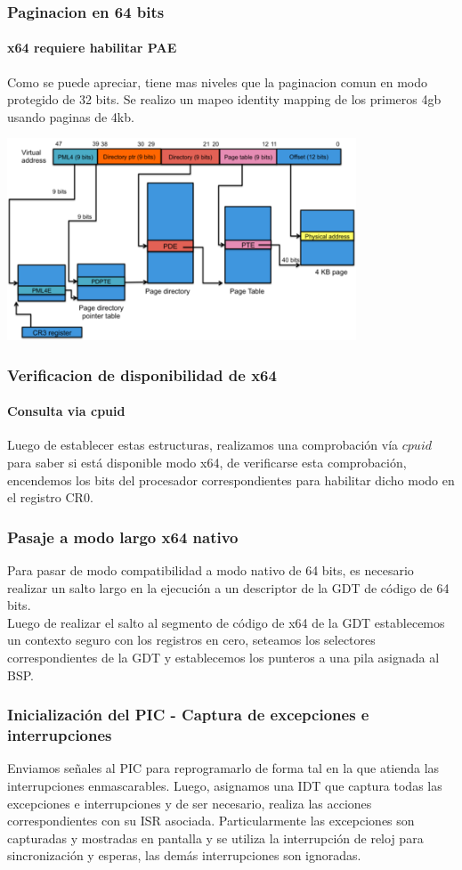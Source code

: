\documentclass{beamer}
\begin{document}
	\begin{frame}
		\frametitle{Paginacion en 64 bits}
		\framesubtitle{x64 requiere habilitar PAE}
		Como se puede apreciar, tiene mas niveles que la paginacion comun en modo protegido de 32 bits.
		Se realizo un mapeo identity mapping de los primeros 4gb usando paginas de 4kb.
		\begin{center}
	        \includegraphics[height=6cm]{images/ia32-paging-overview.png}
	    \end{center}
	\end{frame}

	\begin{frame}
		\frametitle{Verificacion de disponibilidad de x64}
		\framesubtitle{Consulta via cpuid}
		Luego de establecer estas estructuras, realizamos una comprobación vía $cpuid$ para saber si está disponible modo x64, de verificarse esta comprobación, encendemos los bits del procesador correspondientes para habilitar dicho modo en el registro CR0.
	\end{frame}

	\begin{frame}
	    \frametitle{Pasaje a modo largo x64 nativo}

	    Para pasar de modo compatibilidad a modo nativo de 64 bits, es necesario realizar un salto largo en la ejecución a un descriptor de la GDT de código de 64 bits.\\
	    Luego de realizar el salto al segmento de código de x64 de la GDT establecemos un contexto seguro con los registros en cero, seteamos los selectores correspondientes de la GDT y establecemos los punteros a una pila asignada al BSP.
	\end{frame}

	\begin{frame}
	    \frametitle{Inicialización del PIC - Captura de excepciones e interrupciones}
		
	    Enviamos señales al PIC para reprogramarlo de forma tal en la que atienda las interrupciones enmascarables.
	    Luego, asignamos una IDT que captura todas las excepciones e interrupciones y de ser necesario, realiza las acciones correspondientes con su ISR asociada. Particularmente las excepciones son capturadas y mostradas en pantalla y se utiliza la interrupción de reloj para sincronización y esperas, las demás interrupciones son ignoradas.
	\end{frame}
\end{document}
